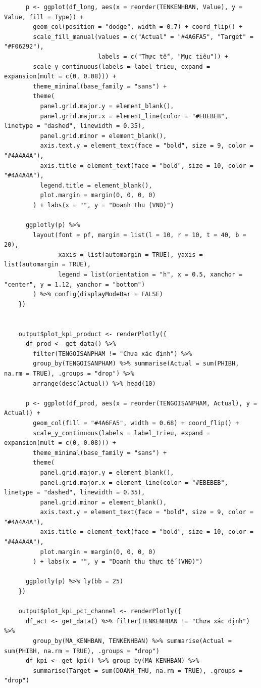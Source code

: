 \documentclass[12pt, a4paper]{article}
\begin{document}
\begin{lstlisting}
      p <- ggplot(df_long, aes(x = reorder(TENKENHBAN, Value), y = Value, fill = Type)) +
        geom_col(position = "dodge", width = 0.7) + coord_flip() +
        scale_fill_manual(values = c("Actual" = "#4A6FA5", "Target" = "#F06292"),
                          labels = c("Thực tế", "Mục tiêu")) +
        scale_y_continuous(labels = label_trieu, expand = expansion(mult = c(0, 0.08))) +
        theme_minimal(base_family = "sans") +
        theme(
          panel.grid.major.y = element_blank(),
          panel.grid.major.x = element_line(color = "#EBEBEB", linetype = "dashed", linewidth = 0.35),
          panel.grid.minor = element_blank(),
          axis.text.y = element_text(face = "bold", size = 9, color = "#4A4A4A"),
          axis.title = element_text(face = "bold", size = 10, color = "#4A4A4A"),
          legend.title = element_blank(),
          plot.margin = margin(0, 0, 0, 0)
        ) + labs(x = "", y = "Doanh thu (VNĐ)")

      ggplotly(p) %>%
        layout(font = pf, margin = list(l = 10, r = 10, t = 40, b = 20),
               xaxis = list(automargin = TRUE), yaxis = list(automargin = TRUE),
               legend = list(orientation = "h", x = 0.5, xanchor = "center", y = 1.12, yanchor = "bottom")
        ) %>% config(displayModeBar = FALSE)
    })


    output$plot_kpi_product <- renderPlotly({
      df_prod <- get_data() %>%
        filter(TENGOISANPHAM != "Chưa xác định") %>%
        group_by(TENGOISANPHAM) %>% summarise(Actual = sum(PHIBH, na.rm = TRUE), .groups = "drop") %>%
        arrange(desc(Actual)) %>% head(10)

      p <- ggplot(df_prod, aes(x = reorder(TENGOISANPHAM, Actual), y = Actual)) +
        geom_col(fill = "#4A6FA5", width = 0.68) + coord_flip() +
        scale_y_continuous(labels = label_trieu, expand = expansion(mult = c(0, 0.08))) +
        theme_minimal(base_family = "sans") +
        theme(
          panel.grid.major.y = element_blank(),
          panel.grid.major.x = element_line(color = "#EBEBEB", linetype = "dashed", linewidth = 0.35),
          panel.grid.minor = element_blank(),
          axis.text.y = element_text(face = "bold", size = 9, color = "#4A4A4A"),
          axis.title = element_text(face = "bold", size = 10, color = "#4A4A4A"),
          plot.margin = margin(0, 0, 0, 0)
        ) + labs(x = "", y = "Doanh thu thực tế (VNĐ)")

      ggplotly(p) %>% ly(bb = 25)
    })

    output$plot_kpi_pct_channel <- renderPlotly({
      df_act <- get_data() %>% filter(TENKENHBAN != "Chưa xác định") %>%
        group_by(MA_KENHBAN, TENKENHBAN) %>% summarise(Actual = sum(PHIBH, na.rm = TRUE), .groups = "drop")
      df_kpi <- get_kpi() %>% group_by(MA_KENHBAN) %>%
        summarise(Target = sum(DOANH_THU, na.rm = TRUE), .groups = "drop")


\end{lstlisting}
\end{document}

